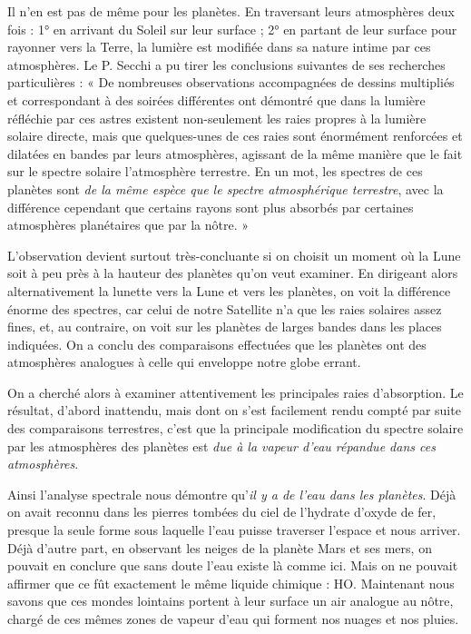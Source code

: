 \documentclass[a4paper, 11pt, oneside]{article}
\begin{document}
Il n'en est pas de même pour les planètes. En traversant leurs atmosphères deux fois : 1° en arrivant du Soleil sur leur surface ; 2° en partant de leur surface pour rayonner vers la Terre, la lumière est modifiée dans sa nature intime par ces atmosphères. Le P. Secchi a pu tirer les conclusions suivantes de ses recherches particulières : « De nombreuses observations accompagnées de dessins multipliés et correspondant à des soirées différentes ont démontré que dans la lumière réfléchie par ces astres existent non-seulement les raies propres à la lumière solaire directe, mais que quelques-unes de ces raies sont énormément renforcées et dilatées en bandes par leurs atmosphères, agissant de la même manière que le fait sur le spectre solaire l'atmosphère terrestre. En un mot, les spectres de ces planètes sont \emph{de la même espèce que le spectre atmosphérique terrestre}, avec la différence cependant que certains rayons sont plus absorbés par certaines atmosphères planétaires que par la nôtre. »

L'observation devient surtout très-concluante si on choisit un moment où la Lune soit à peu près à la hauteur des planètes qu'on veut examiner. En dirigeant alors alternativement la lunette vers la Lune et vers les planètes, on voit la différence énorme des spectres, car celui de notre Satellite n'a que les raies solaires assez fines, et, au contraire, on voit sur les planètes de larges bandes dans les places indiquées. On a conclu des comparaisons effectuées que les planètes ont des atmosphères analogues à celle qui enveloppe notre globe errant.

On a cherché alors à examiner attentivement les principales raies d'absorption. Le résultat, d'abord inattendu, mais dont on s'est facilement rendu compté par suite des comparaisons terrestres, c'est que la principale modification du spectre solaire par les atmosphères des planètes est \emph{due à la vapeur d'eau répandue dans ces atmosphères}.

Ainsi l'analyse spectrale nous démontre qu'\emph{il y a de l'eau dans les planètes}. Déjà on avait reconnu dans les pierres tombées du ciel de l'hydrate d'oxyde de fer, presque la seule forme sous laquelle l'eau puisse traverser l'espace et nous arriver. Déjà d'autre part, en observant les neiges de la planète Mars et ses mers, on pouvait en conclure que sans doute l'eau existe là comme ici. Mais on ne pouvait affirmer que ce fût exactement le même liquide chimique : HO. Maintenant nous savons que ces mondes lointains portent à leur surface un air analogue au nôtre, chargé de ces mêmes zones de vapeur d'eau qui forment nos nuages et nos pluies.
\end{document}
